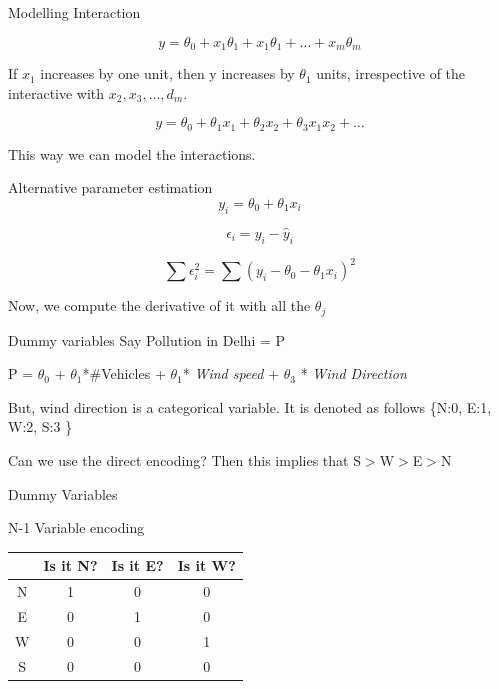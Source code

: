\documentclass{beamer}
\begin{document}
\begin{frame}{Modelling Interaction}
    
    $$
    y = \theta_{0} + x_{1}\theta_{1} +
    x_{1}\theta_{1} +
    \dots + x_{m}\theta_{m} 
    $$
    
    If $x_{1}$ increases by one unit, then y increases by $\theta_{1}$ units, irrespective of the interactive with $x_{2},x_{3},\dots,d_{m}$.
    
    $$
    y = \theta_{0} + \theta_{1}x_{1} + \theta_{2}x_{2} + \theta_{3}x_{1}x_{2} + \dots
    $$

    This way we can model the interactions. 
\end{frame}
\begin{frame}{Alternative parameter estimation}
    $$
    y_{i} = \theta_{0} + \theta_{1}x_{i}
    $$
    
    $$
    \epsilon_{i} = y_{i} - \hat{y}_{i}
    $$
    
    $$
    \sum \epsilon_{i}^{2} = \sum (y_{i} - \theta_{0} - \theta_{1}x_{i})^{2}
    $$
    
    Now, we compute the derivative of it with all the  $\theta_{j}$
    
    
\end{frame}


\begin{frame}{Dummy variables}
    Say Pollution in Delhi = P
    \begin{center}
         P = $\theta_{0}$ + $\theta_{1}$*\#Vehicles + $\theta_{1}$*
        \textit{Wind speed} + $\theta_{3}$ * \textit{Wind Direction}
    \end{center}
    
    But, wind direction is a categorical variable. It is denoted as follows \{N:0, E:1, W:2, S:3 \}\\
    \vspace{3em}
    
    Can we use the direct encoding? Then this implies that S$>$W$>$E$>$N
\end{frame}

\begin{frame}{Dummy Variables}
    \begin{center}
    
        N-1 Variable encoding\\
        \vspace{1em}
        \begin{tabular}{|c|c|c|c|}
        \hline
        & Is it N? &Is it E? &Is it W?\\
        \hline
        \hline
            N & 1&0&0 \\
            E & 0&1&0\\
            W & 0&0&1\\
            S & 0&0&0\\
        \hline
        \end{tabular}
    
    \end{center}
\end{frame}
\end{document}
